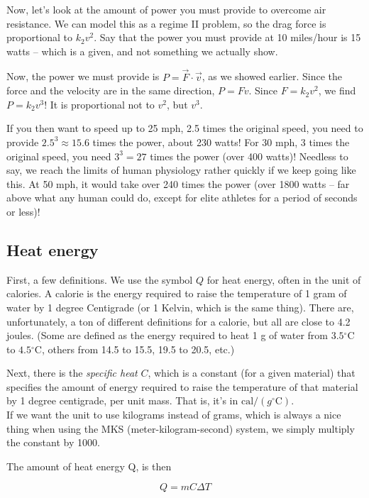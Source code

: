 \documentclass[8.01x]{subfiles}
\begin{document}
Now, let's look at the amount of power you must provide to overcome air resistance. We can model this as a regime II problem, so the drag force is proportional to $k_2 v^2$. Say that the power you must provide at 10 miles/hour is 15 watts -- which is a given, and not something we actually show.

Now, the power we must provide is $P = \vec{F} \cdot \vec{v}$, as we showed earlier. Since the force and the velocity are in the same direction, $P = F v$. Since $F = k_2 v^2$, we find $P = k_2 v^3$! It is proportional not to $v^2$, but $v^3$.

If you then want to speed up to 25 mph, 2.5 times the original speed, you need to provide $2.5^{3} \approx 15.6$ times the power, about 230 watts! For 30 mph, 3 times the original speed, you need $3^3 = 27$ times the power (over 400 watts)! Needless to say, we reach the limits of human physiology rather quickly if we keep going like this. At 50 mph, it would take over 240 times the power (over 1800 watts -- far above what any human could do, except for elite athletes for a period of seconds or less)!

\subsection{Heat energy}

First, a few definitions. We use the symbol $Q$ for heat energy, often in the unit of calories. A calorie is the energy required to raise the temperature of 1 gram of water by 1 degree Centigrade (or 1 Kelvin, which is the same thing). There are, unfortunately, a ton of different definitions for a calorie, but all are close to 4.2 joules. (Some are defined as the energy required to heat 1 g of water from $3.5 {}^\circ$C to $4.5 {}^\circ$C, others from 14.5 to 15.5, 19.5 to 20.5, etc.)

Next, there is the \emph{specific heat} $C$, which is a constant (for a given material) that specifies the amount of energy required to raise the temperature of that material by 1 degree centigrade, per unit mass. That is, it's in $\text{cal}/(g {}^\circ\text{C})$.\\
If we want the unit to use kilograms instead of grams, which is always a nice thing when using the MKS (meter-kilogram-second) system, we simply multiply the constant by 1000.

The amount of heat energy Q, is then

\begin{equation}
Q = m C \Delta T
\end{equation}
\end{document}
